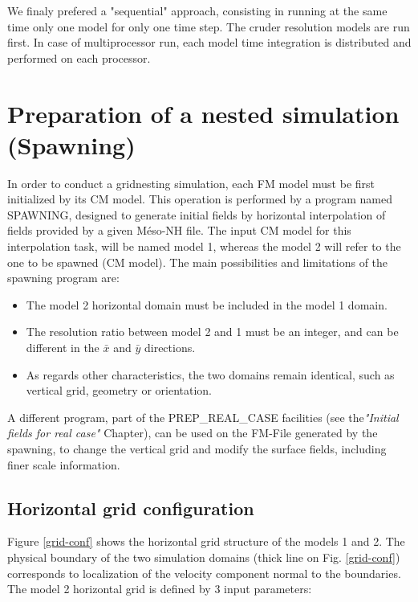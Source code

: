 We finaly prefered a "sequential" approach, consisting in running at the same time
only one model for only one time step. The cruder resolution models are run first.
In case of multiprocessor run, each model time integration is distributed and
performed on each processor.


 \section{Preparation of a nested simulation (Spawning)}

 In order to conduct a gridnesting simulation, each FM model must be first
initialized by its CM model.
This operation is performed by a program named SPAWNING,
designed to generate initial fields by horizontal interpolation
of fields provided by a given M\'eso-NH file.
The input CM model for this interpolation task, will be named model 1,
whereas the model 2 will refer to the one to be spawned (CM model).
The main possibilities and limitations of the spawning program are:

\begin{itemize}
\item The model 2 horizontal domain must be included in the model 1 domain.
\item The resolution ratio between model 2 and 1 must be an integer, and
can be different in the $\bar x$ and $\bar y$ directions.
\item As regards other
characteristics, the two domains remain identical, such as vertical grid,
geometry or orientation.
\end{itemize}

 A different program, part of the PREP\_REAL\_CASE facilities
(see the{\it "Initial fields for real case"} Chapter), can be used
on the FM-File generated by the spawning, to change the vertical grid and
modify the surface fields, including finer scale information.

\subsection{Horizontal grid configuration}

 Figure \ref{grid-conf} shows the horizontal grid structure of the models 1 and
2. The physical boundary of the two simulation domains (thick line on
Fig. \ref{grid-conf}) corresponds to localization of the velocity component
normal to the boundaries.
 The  model 2 horizontal grid is defined by 3 input parameters:

